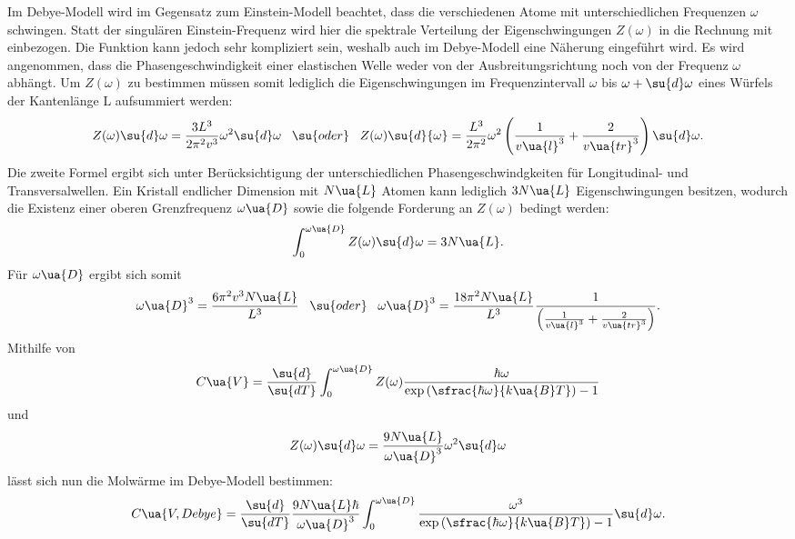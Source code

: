 Im Debye-Modell wird im Gegensatz zum Einstein-Modell beachtet, dass die verschiedenen
Atome mit unterschiedlichen Frequenzen $\omega$ schwingen. Statt der singulären
Einstein-Frequenz wird hier die spektrale Verteilung der Eigenschwingungen $Z(\omega)$
in die Rechnung mit einbezogen. Die Funktion kann jedoch sehr kompliziert sein,
weshalb auch im Debye-Modell eine Näherung eingeführt wird. Es wird angenommen,
dass die Phasengeschwindigkeit einer elastischen Welle weder von der Ausbreitungsrichtung
noch von der Frequenz $\omega$ abhängt. Um $Z(\omega)$ zu bestimmen müssen somit
lediglich die Eigenschwingungen im Frequenzintervall $\omega$ bis $\omega + \su{d}\omega$
eines Würfels der Kantenlänge L aufsummiert werden:
\begin{equation}
  \label{eqn:Z}
  Z(\omega)\su{d}\omega = \frac{3L^3}{2\pi^2v^3}\omega^2\su{d}\omega \,\,\,\,\, \su{oder} \,\,\,\,\,
  Z(\omega)\su{d}{\omega} = \frac{L^3}{2\pi^2}\omega^2\left( \frac{1}{v\ua{l}^3} + \frac{2}{v\ua{tr}^3}\right)\su{d}\omega.
\end{equation}
Die zweite Formel ergibt sich unter Berücksichtigung der unterschiedlichen Phasengeschwindgkeiten
für Longitudinal- und Transversalwellen.
Ein Kristall endlicher Dimension mit $N\ua{L}$ Atomen kann lediglich $3N\ua{L}$
Eigenschwingungen besitzen, wodurch die Existenz einer oberen Grenzfrequenz $\omega\ua{D}$
sowie die folgende Forderung an $Z(\omega)$ bedingt werden:
\begin{equation}
  \int_0^{\omega\ua{D}}Z(\omega)\su{d}\omega = 3N\ua{L}.
\end{equation}
Für $\omega\ua{D}$ ergibt sich somit
\begin{equation}
  \label{eqn:omega_D}
  \omega\ua{D}^3 = \frac{6\pi^2v^3N\ua{L}}{L^3} \,\,\,\,\, \su{oder} \,\,\,\,\,
  \omega\ua{D}^3 = \frac{18\pi^2N\ua{L}}{L^3} \frac{1}{\left(\frac{1}{v\ua{l}^3}+\frac{2}{v\ua{tr}^3}\right)}.
\end{equation}
Mithilfe von
\begin{equation}
  C\ua{V} = \frac{\su{d}}{\su{dT}} \int_0^{\omega\ua{D}} Z(\omega) \frac{\hbar\omega}{\exp{(\sfrac{\hbar\omega}{k\ua{B}T})}-1}
\end{equation}
und
\begin{equation}
  Z(\omega)\su{d}\omega = \frac{9N\ua{L}}{\omega\ua{D}^3}\omega^2 \su{d}\omega
\end{equation}
lässt sich nun die Molwärme im Debye-Modell bestimmen:
\begin{equation}
  C\ua{V, Debye} = \frac{\su{d}}{\su{dT}} \frac{9N\ua{L}\hbar}{\omega\ua{D}^3}\int_0^{\omega\ua{D}} \frac{\omega^3}{\exp{(\sfrac{\hbar\omega}{k\ua{B}T})}-1} \su{d}\omega.
\end{equation}
